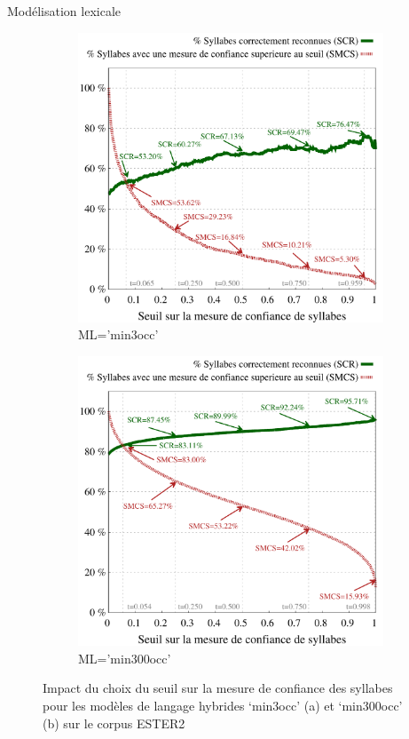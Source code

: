 \documentclass{style/these}
\begin{document}
\begin{part}{Modélisation lexicale}
\begin{figure}[h!]
\begin{subfigure}{0.5\textwidth}
\centering
\includegraphics[scale=0.41]{images/results/ESTER_combined_min3occ_syllables_CM.pdf}
\caption{ML='min3occ'}
\end{subfigure}
\begin{subfigure}{0.5\textwidth}
\centering
\includegraphics[scale=0.41]{images/results/ESTER_combined_min300occ_syllables_CM.pdf}
\caption{ML='min300occ'}
\end{subfigure}
\caption{Impact du choix du seuil sur la mesure de confiance des syllabes pour les modèles de langage hybrides `min3occ' (a) et `min300occ' (b) sur le corpus ESTER2}
\label{Fig:MC-syllabes-ESTER2}
\end{figure}


\end{part}
\end{document}
